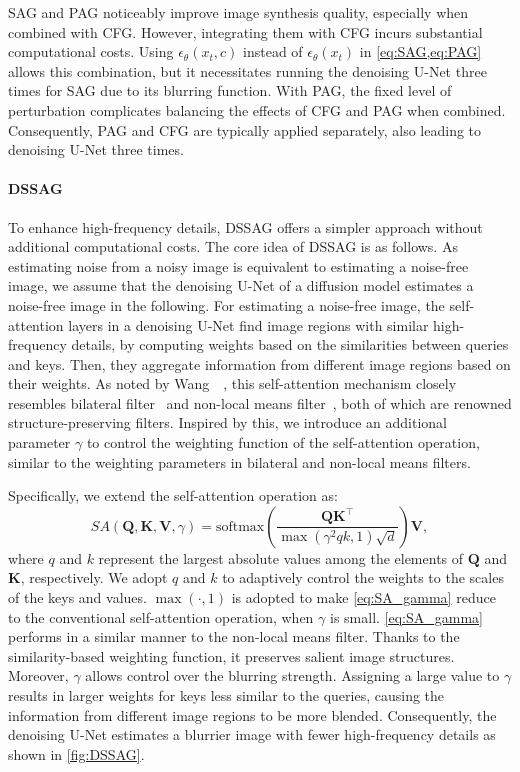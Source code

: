 SAG and PAG noticeably improve image synthesis quality, especially when combined with CFG. However, integrating them with CFG incurs substantial computational costs. Using $\epsilon_\theta(x_t,c)$ instead of $\epsilon_\theta(x_t)$ in \cref{eq:SAG,eq:PAG} allows this combination, but it necessitates running the denoising U-Net three times for SAG due to its blurring function. With PAG, the fixed level of perturbation complicates balancing the effects of CFG and PAG when combined. Consequently, PAG and CFG are typically applied separately, also leading to denoising U-Net three times.



\paragraph{DSSAG} To enhance high-frequency details, DSSAG offers a simpler approach without additional computational costs. The core idea of DSSAG is as follows.
As estimating noise from a noisy image is equivalent to estimating a noise-free image, we assume that the denoising U-Net of a diffusion model estimates a noise-free image in the following.
For estimating a noise-free image, the self-attention layers in a denoising U-Net find image regions with similar high-frequency details, by computing weights based on the similarities between queries and keys. Then, they aggregate information from different image regions based on their weights.
As noted by Wang~\etal~, this self-attention mechanism closely resembles bilateral filter~\cite{tomasi1998bilateral} and non-local means filter~\cite{buades2005nonlocal}, both of which are renowned structure-preserving filters.
Inspired by this, we introduce an additional parameter $\gamma$ to control the weighting function of the self-attention operation, similar to the weighting parameters in bilateral and non-local means filters.

Specifically, we extend the self-attention operation as:
\begin{equation}
    SA(\bm{Q},\bm{K},\bm{V},\gamma) = \text{softmax}\left(\frac{\bm{Q}\bm{K}^\top}{\max(\gamma^2qk,1)\sqrt{d}}\right)\bm{V},
    \label{eq:SA_gamma}
\end{equation}
where $q$ and $k$ represent the largest absolute values among the elements of $\bm{Q}$ and $\bm{K}$, respectively.
We adopt $q$ and $k$ to adaptively control the weights to the scales of the keys and values. $\max(\cdot,1)$ is adopted to make \cref{eq:SA_gamma} reduce to the conventional self-attention operation, when $\gamma$ is small.
\cref{eq:SA_gamma} performs in a similar manner to the non-local means filter. Thanks to the similarity-based weighting function, it preserves salient image structures.
Moreover, $\gamma$ allows control over the blurring strength.
Assigning a large value to $\gamma$ results in larger weights for keys less similar to the queries, causing the information from different image regions to be more blended. Consequently, the denoising U-Net estimates a blurrier image with fewer high-frequency details as shown in \cref{fig:DSSAG}.

